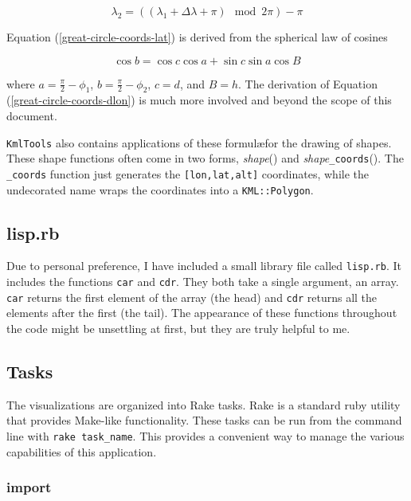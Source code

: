\documentclass[12pt]{article}
\begin{document}
\begin{equation}
\lambda_2 = \left((\lambda_1+\Delta\lambda+\pi) \mod 2\pi\right)-\pi
\end{equation}

Equation (\ref{great-circle-coords-lat}) is derived from the spherical law of cosines

\begin{equation}
\cos{b} =\cos{c}\cos{a} + \sin c\sin a\cos B
\end{equation}

where $a=\frac{\pi}{2}-\phi_1$, $b=\frac{\pi}{2}-\phi_2$, $c=d$, and $B=h$.  The derivation of Equation (\ref{great-circle-coords-dlon}) is much more involved and beyond the scope of this document.

\texttt{KmlTools} also contains applications of these formul\ae for the drawing of shapes.  These shape functions often come in two forms, \textit{shape}() and \textit{shape}\texttt{\_coords}().  The \texttt{\_coords} function just generates the \texttt{[lon,lat,alt]} coordinates, while the undecorated name wraps the coordinates into a \texttt{KML::Polygon}.

\subsection*{lisp.rb}

Due to personal preference, I have included a small library file called \texttt{lisp.rb}.  It includes the functions \texttt{car} and \texttt{cdr}.  They both take a single argument, an array.  \texttt{car} returns the first element of the array (the head) and \texttt{cdr} returns all the elements after the first (the tail).  The appearance of these functions throughout the code might be unsettling at first, but they are truly helpful to me.

\subsection*{Tasks}

The visualizations are organized into Rake tasks.  Rake is a standard ruby utility that provides Make-like functionality.  These tasks can be run from the command line with \texttt{rake task\_name}.  This provides a convenient way to manage the various capabilities of this application.

\subsubsection*{import}
\end{document}
